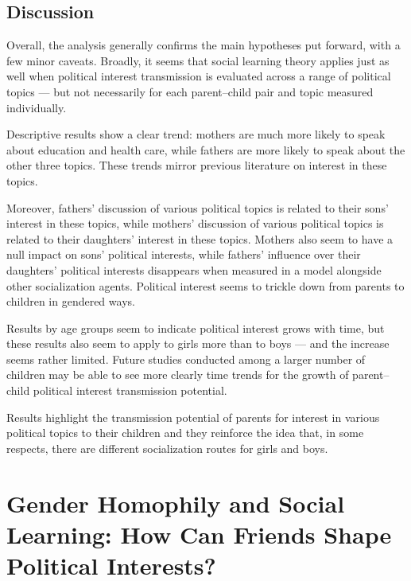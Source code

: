 \documentclass[
  letterpaper,
  DIV=11,
  numbers=noendperiod]{scrreprt}
\begin{document}
\section{Discussion}\label{discussion-1}

Overall, the analysis generally confirms the main hypotheses put
forward, with a few minor caveats. Broadly, it seems that social
learning theory applies just as well when political interest
transmission is evaluated across a range of political topics --- but not
necessarily for each parent--child pair and topic measured individually.

Descriptive results show a clear trend: mothers are much more likely to
speak about education and health care, while fathers are more likely to
speak about the other three topics. These trends mirror previous
literature on interest in these topics.

Moreover, fathers' discussion of various political topics is related to
their sons' interest in these topics, while mothers' discussion of
various political topics is related to their daughters' interest in
these topics. Mothers also seem to have a null impact on sons' political
interests, while fathers' influence over their daughters' political
interests disappears when measured in a model alongside other
socialization agents. Political interest seems to trickle down from
parents to children in gendered ways.

Results by age groups seem to indicate political interest grows with
time, but these results also seem to apply to girls more than to boys
--- and the increase seems rather limited. Future studies conducted
among a larger number of children may be able to see more clearly time
trends for the growth of parent--child political interest transmission
potential.

Results highlight the transmission potential of parents for interest in
various political topics to their children and they reinforce the idea
that, in some respects, there are different socialization routes for
girls and boys.


\chapter{Gender Homophily and Social Learning: How Can Friends Shape
Political Interests?}\label{sec-chap5}
\end{document}
